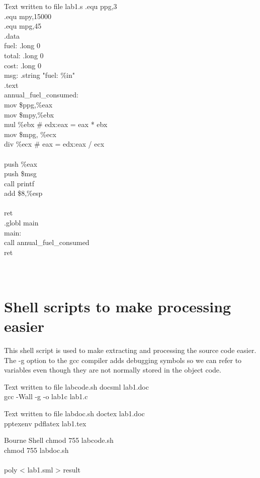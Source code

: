\documentclass{article}
\begin{document}
\begin{GFT}{Text written to file lab1.s}
\+.equ ppg,3\\
\+.equ mpy,15000\\
\+.equ mpg,45\\
\+.data\\
\+  fuel: .long 0\\
\+  total: .long 0\\
\+  cost: .long 0\\
\+msg: .string "fuel: \%i\Backslash{}n"\\
\+.text\\
\+ annual\_fuel\_consumed:\\
\+  mov \$ppg,\%eax\\
\+  mov \$mpy,\%ebx\\
\+  mul \%ebx \# edx:eax = eax * ebx\\
\+  mov \$mpg, \%ecx\\
\+  div \%ecx \# eax = edx:eax / ecx\\
\+\\
\+  push \%eax\\
\+  push \$msg\\
\+  call printf\\
\+  add \$8,\%esp\\
\+  \\
\+ ret\\
\+ .globl main\\
\+main:\\
\+ call annual\_fuel\_consumed\\
\+ ret\\
\+\\
\+\\
\end{GFT}
\clearpage
\section*{Shell scripts to make processing easier}
This shell script is used to make extracting and processing the source code easier. The -g option to the gcc compiler adds debugging symbols so we can refer to variables even though they are not normally stored in the object code. 
\begin{GFT}{Text written to file labcode.sh}
\+docsml lab1.doc\\
\+gcc -Wall -g -o lab1c lab1.c\\
\end{GFT}
\begin{GFT}{Text written to file labdoc.sh}
\+doctex lab1.doc\\
\+pptexenv pdflatex lab1.tex\\
\end{GFT}
\begin{GFT}{Bourne Shell}
\+chmod 755 labcode.sh\\
\+chmod 755 labdoc.sh\\
\+\\
\+poly < lab1.sml > result\\
\end{GFT}
\end{document}
